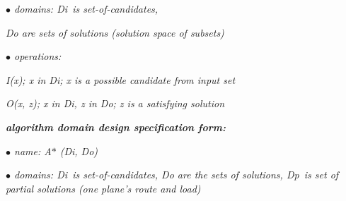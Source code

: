 \documentclass[12pt]{article}
\renewcommand{\_}{\kern-1.5pt\textunderscore\kern-1.5pt}
\begin{document}
\begin{adjustwidth}{0.0in}{-0.01in}
\textit{$\bullet$  domains:  Di\   is set-of-candidates,}\par

\end{adjustwidth}

\begin{adjustwidth}{1.05in}{-0.01in}
\textit{Do are sets of solutions (solution space of subsets)}\par

\end{adjustwidth}

\begin{adjustwidth}{0.0in}{-0.01in}
\textit{$\bullet$  operations:}\par

\end{adjustwidth}

\begin{adjustwidth}{1.05in}{-0.01in}
\textit{I(x); x in Di; x is a possible candidate from input set}\par

\end{adjustwidth}

\begin{adjustwidth}{1.5in}{-0.01in}
\textit{O(x, z); x in Di, z in Do; z is a satisfying solution\textbf{ }}\par

\end{adjustwidth}


\vspace{\baselineskip}
\begin{adjustwidth}{0.0in}{-0.01in}
\textbf{\textit{algorithm domain design speciﬁcation form:}}\par

\end{adjustwidth}

\begin{adjustwidth}{0.58in}{-0.01in}
\textit{$\bullet$  name:  A$\ast$  (Di, Do)}\par

\end{adjustwidth}

\begin{adjustwidth}{0.72in}{0.04in}
\textit{$\bullet$  domains:  Di\   is set-of-candidates, Do are the sets of solutions, Dp\   is set of partial solutions (one plane’s route and load)}\par

\end{adjustwidth}
\end{document}
